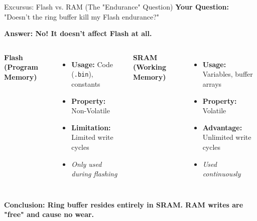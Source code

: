 \documentclass{beamer}
\begin{document}
\begin{frame}{Excursus: Flash vs. RAM (The "Endurance" Question)}
	\textbf{Your Question:} "Doesn't the ring buffer kill my Flash endurance?"
	
	\medskip
	\textbf{Answer: No! It doesn't affect Flash at all.}
	
	\medskip
	\begin{columns}
		\textbf{Flash (Program Memory)}
		\begin{itemize}
			\item \textbf{Usage:} Code (\texttt{.bin}), constants
			\item \textbf{Property:} Non-Volatile
			\item \textbf{Limitation:} Limited write cycles
			\item \textit{Only used during flashing}
		\end{itemize}
		
		\textbf{SRAM (Working Memory)}
		\begin{itemize}
			\item \textbf{Usage:} Variables, buffer arrays
			\item \textbf{Property:} Volatile
			\item \textbf{Advantage:} Unlimited write cycles
			\item \textit{Used continuously}
		\end{itemize}
	\end{columns}
	
	\bigskip
	\textbf{Conclusion: Ring buffer resides entirely in SRAM. RAM writes are "free" and cause no wear.}
\end{frame}
\end{document}
